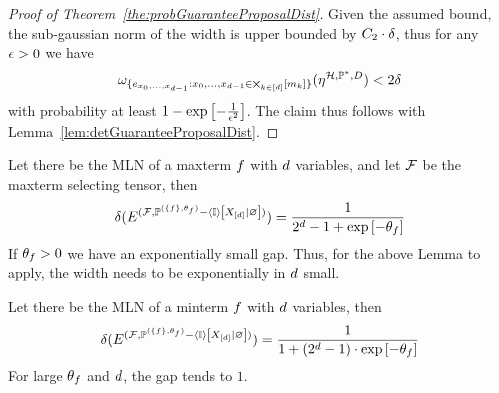 \begin{proof}[Proof of Theorem~\ref{the:probGuaranteeProposalDist}]
	Given the assumed bound, the sub-gaussian norm of the width is upper bounded by $C_2\cdot \delta$, thus for any $\epsilon>0$ we have
		\[  \omega_{\{e_{x_{0},\ldots,x_{d-1}} :x_{0},\ldots,x_{d-1}\in\bigtimes_{k\in[d]}[m_{k}]\}}(\eta^{\mathcal{H},\mathbb{P}^*,D})  < 2 \delta \]
	with probability at least $1-\mathrm{exp}\left[-\frac{1}{\epsilon^2}\right]$.
	The claim thus follows with Lemma~\ref{lem:detGuaranteeProposalDist}.
\end{proof}




\begin{example}
	Let there be the MLN of a maxterm $f$ with $d$ variables, and let $\mathcal{F}$ be the maxterm selecting tensor, then 
		\[ \delta(
		E^{(\mathcal{F}, \mathbb{P}^{(\{f\},\theta_{f})} - \left\langle \mathbb{I}\right\rangle \left[ X_{[d]} | \varnothing \right] )}
		) = \frac{1}{2^{d}-1 + \mathrm{exp}\left[-\theta_{f}\right]}  \]
	If $\theta_{f}>0$ we have an exponentially small gap.
	Thus, for the above Lemma to apply, the width needs to be exponentially in $d$ small.
	
	
	Let there be the MLN of a minterm $f$ with $d$ variables, then 
		\[ \delta(
		E^{(\mathcal{F}, \mathbb{P}^{(\{f\},\theta_{f})} - \left\langle \mathbb{I}\right\rangle \left[ X_{[d]} | \varnothing \right] )}
		) = \frac{1}{1+(2^{d}-1)\cdot\mathrm{exp}\left[-\theta_{f}\right]}  \]
	For large $\theta_{f}$ and $d$, the gap tends to $1$.
\end{example}













